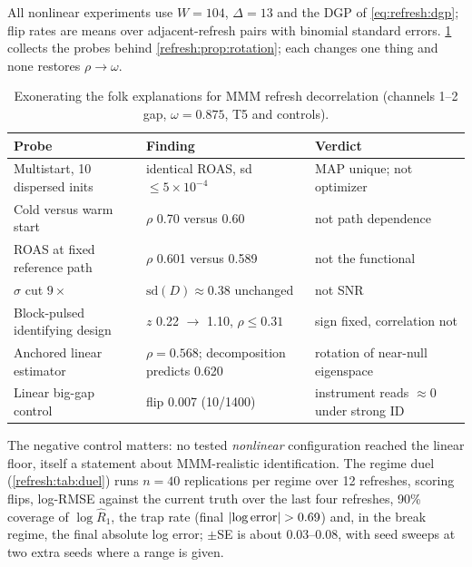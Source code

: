 All nonlinear experiments use $W = 104$, $\Delta = 13$ and the DGP of \cref{eq:refresh:dgp}; flip rates are means over adjacent-refresh pairs with binomial standard errors. \cref{refresh:tab:exonerate} collects the probes behind \cref{refresh:prop:rotation}; each changes one thing and none restores $\rho \to \omega$.

\begin{table}[htbp]
\centering\small
\caption{Exonerating the folk explanations for MMM refresh decorrelation (channels 1--2 gap, $\omega = 0.875$,  T5 and controls).}
\label{refresh:tab:exonerate}
\begin{tabularx}{\textwidth}{lXl}
\toprule
Probe & Finding & Verdict \\
\midrule
Multistart, 10 dispersed inits & identical ROAS, sd $\le 5\times10^{-4}$ & MAP unique; not optimizer \\
Cold versus warm start & $\rho$ 0.70 versus 0.60 & not path dependence \\
ROAS at fixed reference path & $\rho$ 0.601 versus 0.589 & not the functional \\
$\sigma$ cut $9\times$ & $\mathrm{sd}(D) \approx 0.38$ unchanged & not SNR \\
Block-pulsed identifying design & $z$ 0.22 $\to$ 1.10, $\rho \le 0.31$ & sign fixed, correlation not \\
Anchored linear estimator & $\rho = 0.568$; decomposition predicts 0.620 & rotation of near-null eigenspace \\
Linear big-gap control & flip 0.007 (10/1400) & instrument reads $\approx 0$ under strong ID \\
\bottomrule
\end{tabularx}
\end{table}

The negative control matters: no tested \emph{nonlinear} configuration reached the linear floor, itself a statement about MMM-realistic identification. The regime duel (\cref{refresh:tab:duel}) runs $n = 40$ replications per regime over 12 refreshes, scoring flips, log-RMSE against the current truth over the last four refreshes, 90\% coverage of $\log\hat R_1$, the trap rate (final $\left|\log \text{error}\right| > 0.69$) and, in the break regime, the final absolute log error; $\pm$SE is about 0.03--0.08, with seed sweeps at two extra seeds where a range is given.

